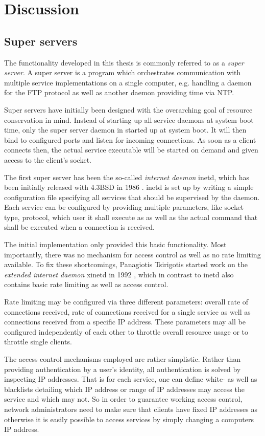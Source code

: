 \section{Discussion}

\subsection{Super servers}

The functionality developed in this thesis is commonly referred to as a \emph{super server}.
A super server is a program which orchestrates communication with multiple service implementations on a single computer, e.g. handling a daemon for the FTP protocol as well as another daemon providing time via NTP.

Super servers have initially been designed with the overarching goal of resource conservation in mind.
Instead of starting up all service daemons at system boot time, only the super server daemon in started up at system boot.
It will then bind to configured ports and listen for incoming connections.
As soon as a client connects then, the actual service executable will be started on demand and given access to the client's socket.

The first super server has been the so-called \emph{internet daemon} inetd, which has been initially released with 4.3BSD in 1986 \cite{inetd}.
inetd is set up by writing a simple configuration file specifying all services that should be supervised by the daemon.
Each service can be configured by providing multiple parameters, like socket type, protocol, which user it shall execute as as well as the actual command that shall be executed when a connection is received.

The initial implementation only provided this basic functionality.
Most importantly, there was no mechanism for access control as well as no rate limiting available.
To fix these shortcomings, Panagiotis Tsirigotis started work on the \emph{extended internet daemon} xinetd in 1992 \cite{xinetd}, which in contrast to inetd also contains basic rate limiting as well as access control.

Rate limiting may be configured via three different parameters: overall rate of connections received, rate of connections received for a single service as well as connections received from a specific IP address.
These parameters may all be configured independently of each other to throttle overall resource usage or to throttle single clients.

The access control mechanisms employed are rather simplistic.
Rather than providing authentication by a user's identity, all authentication is solved by inspecting IP addresses.
That is for each service, one can define white- as well as blacklists detailing which IP address or range of IP addresses may access the service and which may not.
So in order to guarantee working access control, network administrators need to make sure that clients have fixed IP addresses as otherwise it is easily possible to access services by simply changing a computers IP address.

